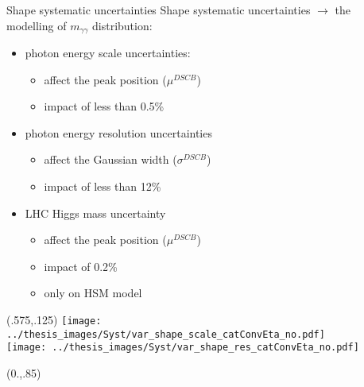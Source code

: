 \documentclass[10pt,UKenglish, leqno, xcolor = dvipsnames]{beamer}
\begin{document}
	\begin{frame}{Shape systematic uncertainties}
		\vfill
		Shape systematic uncertainties $\to$ the\\ modelling of $m_{\gamma\gamma}$ distribution:
		\begin{itemize}
			\item photon energy scale uncertainties:
			\begin{itemize}
				\item affect the peak position ($\mu^{DSCB}$)
				\item impact of less than 0.5\%
			\end{itemize}
			\item photon energy resolution uncertainties
			\begin{itemize}
				\item affect the Gaussian width ($\sigma^{DSCB}$)
				\item impact of less than 12\%
			\end{itemize}
			\item LHC Higgs mass uncertainty
			\begin{itemize}
				\item affect the peak position ($\mu^{DSCB}$)
				\item impact of 0.2\%
				\item only on HSM model
			\end{itemize}
		\end{itemize}
		\vspace{.2cm}
		\vfill
		\begin{textblock}{1}(.575,.125)
			\texttt{[image: ../thesis\_images/Syst/var\_shape\_scale\_catConvEta\_no.pdf]}\\
			\texttt{[image: ../thesis\_images/Syst/var\_shape\_res\_catConvEta\_no.pdf]}\\	
		\end{textblock}	
		\begin{textblock}{1}(0.,.85)
			\begin{figure}
			\end{figure}
		\end{textblock}
	\end{frame}
\end{document}
